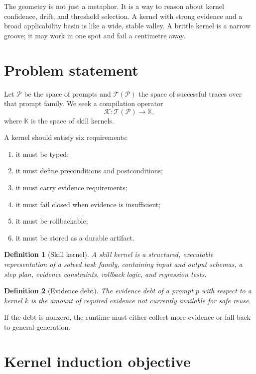 \documentclass{article}
\newtheorem{definition}{Definition}
\begin{document}
The geometry is not just a metaphor. It is a way to reason about kernel confidence, drift, and threshold selection. A kernel with strong evidence and a broad applicability basin is like a wide, stable valley. A brittle kernel is a narrow groove; it may work in one spot and fail a centimetre away.

\section{Problem statement}

Let $\mathcal{P}$ be the space of prompts and $\mathcal{T}(\mathcal{P})$ the space of successful traces over that prompt family. We seek a compilation operator
\[
\mathcal{K}: \mathcal{T}(\mathcal{P}) \to \mathbb{K},
\]
where $\mathbb{K}$ is the space of skill kernels.

A kernel should satisfy six requirements:
\begin{enumerate}[leftmargin=1.2em]
\item it must be typed;
\item it must define preconditions and postconditions;
\item it must carry evidence requirements;
\item it must fail closed when evidence is insufficient;
\item it must be rollbackable;
\item it must be stored as a durable artifact.
\end{enumerate}

\begin{definition}[Skill kernel]
A skill kernel is a structured, executable representation of a solved task family, containing input and output schemas, a step plan, evidence constraints, rollback logic, and regression tests.
\end{definition}

\begin{definition}[Evidence debt]
The evidence debt of a prompt $p$ with respect to a kernel $k$ is the amount of required evidence not currently available for safe reuse.
\end{definition}

If the debt is nonzero, the runtime must either collect more evidence or fall back to general generation.

\section{Kernel induction objective}
\end{document}

